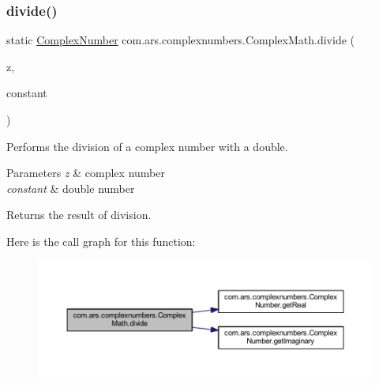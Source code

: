 \subsubsection{\texorpdfstring{divide()}{divide()}\hspace{0.1cm}{\footnotesize\ttfamily [2/2]}}
{\footnotesize\ttfamily static \hyperlink{classcom_1_1ars_1_1complexnumbers_1_1_complex_number}{Complex\+Number} com.\+ars.\+complexnumbers.\+Complex\+Math.\+divide (\begin{DoxyParamCaption}\item[{\hyperlink{classcom_1_1ars_1_1complexnumbers_1_1_complex_number}{Complex\+Number}}]{z,  }\item[{double}]{constant }\end{DoxyParamCaption})\hspace{0.3cm}{\ttfamily [static]}}

Performs the division of a complex number with a double. 
\begin{DoxyParams}{Parameters}
{\em z} & complex number \\
\hline
{\em constant} & double number \\
\hline
\end{DoxyParams}
\begin{DoxyReturn}{Returns}
the result of division. 
\end{DoxyReturn}
Here is the call graph for this function\+:
\nopagebreak
\begin{figure}[H]
\begin{center}
\leavevmode
\includegraphics[width=350pt]{classcom_1_1ars_1_1complexnumbers_1_1_complex_math_aeca04302a95a0a22e5bd7069455aacf6_cgraph}
\end{center}
\end{figure}
\hypertarget{classcom_1_1ars_1_1complexnumbers_1_1_complex_math_a9a15203fe621aaa3738dd41d19b70b5f}{}\label{classcom_1_1ars_1_1complexnumbers_1_1_complex_math_a9a15203fe621aaa3738dd41d19b70b5f} 
